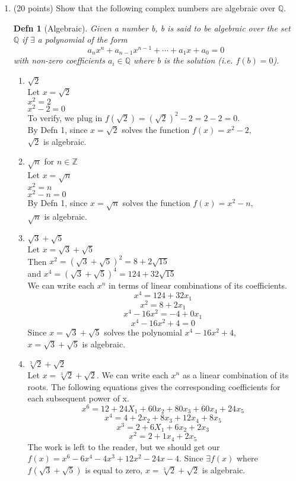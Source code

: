 \documentclass[16pt]{article}
\newtheorem{defn}{Defn}
\begin{document}
\begin{enumerate}
\raggedright
\item(20 points) Show that the following complex numbers are algebraic over $\mathbb{Q}$.\\
\begin{defn}[Algebraic]
Given a number b, b is said to be algebraic over the set $\mathbb{Q}$ if $\exists$ a polynomial of the form 
\[a_nx^n + a_{n-1}x^{n-1} + \cdots + a_1x +a_0 = 0 \] with non-zero coefficients $a_i \in \mathbb{Q}$ where b is the solution (i.e. $f(b)=0$).
\end{defn}
\begin{enumerate}
\item $\sqrt{2}$\\
Let $x=\sqrt{2}$\\$x^2=2$\\$x^2-2=0$\\
To verify, we plug in $f(\sqrt{2})=(\sqrt{2})^2-2=2-2=0$.\\By Defn 1, since $x=\sqrt{2}$ solves the function $f(x)=x^2-2,$ 
\\$\sqrt{2}$ is algebraic.\\
\item $\sqrt{n}$ for $n \in \mathbb{Z}$\\Let $x=\sqrt{n}$\\$x^2=n$\\$x^2-n=0$\\By Defn 1, since $x=\sqrt{n}$ solves the function $f(x)=x^2-n,$
\\$\sqrt{n}$ is algebraic.\\
\item $\sqrt{3}+\sqrt{5}$\\Let $x=\sqrt{3}+\sqrt{5}$\\
Then $x^2=(\sqrt{3}+\sqrt{5})^2=8+2\sqrt{15}$\\
and $x^4=(\sqrt{3}+\sqrt{5})^4=124+32\sqrt{15}$\\
We can write each $x^n$ in terms of linear combinations of its coefficients.
\[x^4=124+32x_1\]
\[x^2=8+2x_1\]
\[x^4-16x^2=-4+0x_1\]
\[x^4-16x^2+4=0\]
Since $x=\sqrt{3}+\sqrt{5}$ solves the polynomial $x^4-16x^2+4$,\\
$x=\sqrt{3}+\sqrt{5}$ is algebraic.\\
\item$\sqrt[3]{2}+\sqrt{2}$\\
Let $x=\sqrt[3]{2}+\sqrt{2}$. We can write each $x^n$ as a linear combination of its roots. The following equations gives the corresponding coefficients for each subsequent power of x.\\
\[x^6=12+24X_1+60x_2+80x_3+60x_4+24x_5\]
\[x^4=4+2x_2+8x_3+12x_4+8x_5\]
\[x^3=2+6X_1+6x_2+2x_3\]
\[x^2=2+1x_4+2x_5\]
The work is left to the reader, but we should get our $f(x)=x^6-6x^4-4x^3+12x^2-24x-4$. Since $\exists f(x)$ where $f(\sqrt{3}+\sqrt{5})$ is equal to zero, $x=\sqrt[3]{2}+\sqrt{2}$ is algebraic.

\end{enumerate}
\end{enumerate}
\end{document}
